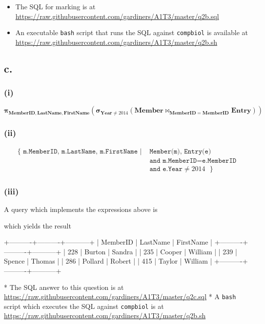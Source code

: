 \documentclass{article}
\newcommand{\select}[1]{
\boldsymbol{\sigma}_{#1}
}
\newcommand{\project}[1]{
\boldsymbol{\pi}_{#1}
}
\newcommand{\join}[1]{
\boldsymbol{\bowtie}_{#1}
}
\begin{document}
\begin{itemize}
    \item The SQL for marking is at \url{https://raw.githubusercontent.com/gardiners/A1T3/master/q2b.sql}
    \item An executable \texttt{bash} script that runs the SQL against \texttt{compbiol} is available at \url{https://raw.githubusercontent.com/gardiners/A1T3/master/q2b.sh}
\end{itemize}

\subsection{c.}

\subsubsection{(i)}

$$
\project{\mathbf{MemberID, LastName, FirstName}}
\left(
    \select{\mathbf{Year} \ne 2014}
        \left(\mathbf{Member} \join{\mathbf{MemberID} = \mathbf{MemberID}} \mathbf{Entry} \right)
\right)
$$

\subsubsection{(ii)}

$$
\begin{aligned}
\{
\texttt{ m.MemberID, m.LastName, m.FirstName } | &\texttt{ Member(m), Entry(e)} \\
    &\texttt{ and m.MemberID} = \texttt{e.MemberID} \\
    &\texttt{ and e.Year} \ne 2014
\texttt{ } \}
\end{aligned}
$$

\subsubsection{(iii)}

A query which implements the expressions above is


which yields the result

\begin{bashinline}
+----------+----------+-----------+
| MemberID | LastName | FirstName |
+----------+----------+-----------+
|      228 | Burton   | Sandra    |
|      235 | Cooper   | William   |
|      239 | Spence   | Thomas    |
|      286 | Pollard  | Robert    |
|      415 | Taylor   | William   |
+----------+----------+-----------+
\end{bashinline}

* The SQL answer to this question is at \url{https://raw.githubusercontent.com/gardiners/A1T3/master/q2c.sql}
* A \texttt{bash} script which executes the SQL against \texttt{compbiol} is at \url{https://raw.githubusercontent.com/gardiners/A1T3/master/q2b.sh}
\end{document}
